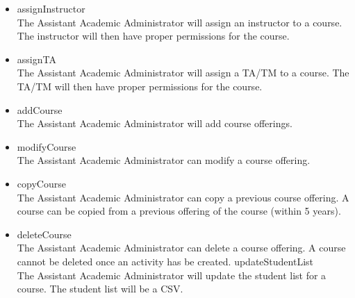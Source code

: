 \documentclass{article}
\begin{document}
\begin{itemize}
\item assignInstructor \hfill \\
The Assistant Academic Administrator will assign an instructor to a course.  The instructor will then have proper permissions for the course.
\item assignTA \hfill \\
The Assistant Academic Administrator will assign a TA/TM to a course.  The TA/TM will then have proper permissions for the course.
\item addCourse \hfill \\
The Assistant Academic Administrator will add course offerings.
\item modifyCourse \hfill \\
The Assistant Academic Administrator can modify a course offering.
\item copyCourse \hfill \\
The Assistant Academic Administrator can copy a previous course offering.  A course can be copied from a previous offering of the course (within 5 years).
\item deleteCourse \hfill \\
The Assistant Academic Administrator can delete a course offering.  A course cannot be deleted once an activity has be created.
updateStudentList \hfill \\
The Assistant Academic Administrator will update the student list for a course.  The student list will be a CSV.


\end{itemize}
\end{document}
